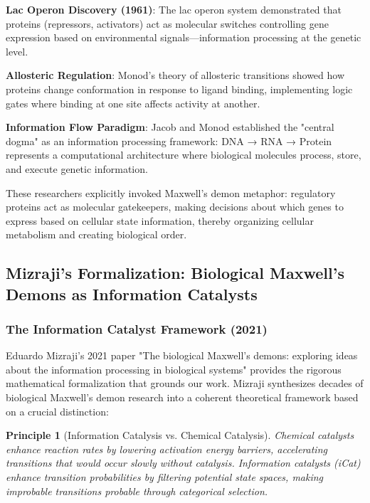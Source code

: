 \documentclass[11pt,a4paper]{article}
\newtheorem{principle}{Principle}[section]
\begin{document}
\textbf{Lac Operon Discovery (1961)}: The lac operon system demonstrated that proteins (repressors, activators) act as molecular switches controlling gene expression based on environmental signals—information processing at the genetic level\cite{jacob1965genetic}.

\textbf{Allosteric Regulation}: Monod's theory of allosteric transitions showed how proteins change conformation in response to ligand binding, implementing logic gates where binding at one site affects activity at another\cite{monod1965allosteric}.

\textbf{Information Flow Paradigm}: Jacob and Monod established the "central dogma" as an information processing framework: DNA → RNA → Protein represents a computational architecture where biological molecules process, store, and execute genetic information\cite{jacob1961messenger}.

These researchers explicitly invoked Maxwell's demon metaphor: regulatory proteins act as molecular gatekeepers, making decisions about which genes to express based on cellular state information, thereby organizing cellular metabolism and creating biological order.

\subsection{Mizraji's Formalization: Biological Maxwell's Demons as Information Catalysts}

\subsubsection{The Information Catalyst Framework (2021)}

Eduardo Mizraji's 2021 paper "The biological Maxwell's demons: exploring ideas about the information processing in biological systems" provides the rigorous mathematical formalization that grounds our work\cite{mizraji2021biological}. Mizraji synthesizes decades of biological Maxwell's demon research into a coherent theoretical framework based on a crucial distinction:

\begin{principle}[Information Catalysis vs. Chemical Catalysis]
Chemical catalysts enhance \textit{reaction rates} by lowering activation energy barriers, accelerating transitions that would occur slowly without catalysis. Information catalysts (iCat) enhance \textit{transition probabilities} by filtering potential state spaces, making improbable transitions probable through categorical selection.
\end{principle}
\end{document}
